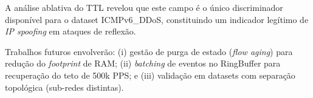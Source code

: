 \documentclass[12pt,a4paper]{article}
\begin{document}
A an\'{a}lise ablativa do TTL revelou que este campo \'{e} o \'{u}nico discriminador dispon\'{i}vel para o dataset ICMPv6\_DDoS, constituindo um indicador leg\'{i}timo de \textit{IP spoofing} em ataques de reflex\~{a}o.

Trabalhos futuros envolver\~{a}o: (i) gest\~{a}o de purga de estado (\textit{flow aging}) para redu\c{c}\~{a}o do \textit{footprint} de RAM; (ii) \textit{batching} de eventos no RingBuffer para recupera\c{c}\~{a}o do teto de 500k PPS; e (iii) valida\c{c}\~{a}o em datasets com separa\c{c}\~{a}o topol\'{o}gica (sub-redes distintas).
\end{document}
